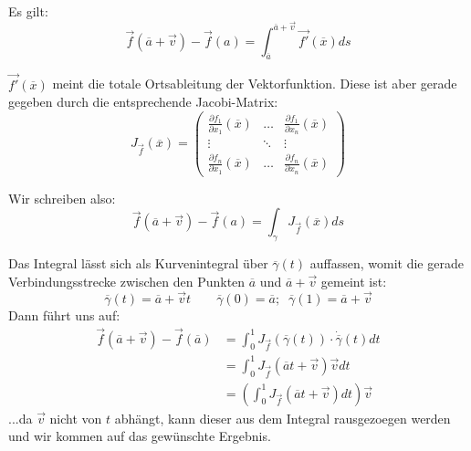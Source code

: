 \documentclass[a4paper,german,12pt,smallheadings]{scrartcl}
\begin{document}
Es gilt:
\begin{equation*}
\vec{f}\left(\overline{a}+\vec{v}\right)-\vec{f}(a)=\int_{\overline{a}}^{\overline{a}+\vec{v}}  \vec{f'}(\overline{x})ds
\end{equation*}

$\vec{f'}(\overline{x})$ meint die totale Ortsableitung der Vektorfunktion. Diese ist aber gerade gegeben durch die entsprechende Jacobi-Matrix:
\begin{equation*}
J_{\vec{f}}(\overline{x})=\begin{pmatrix}
\frac{\partial f_1}{\partial x_1}(\overline{x}) & \dots & \frac{\partial f_1}{\partial x_n}(\overline{x})\\ \vdots & \ddots & \vdots\\ \frac{\partial f_n}{\partial x_1}(\overline{x}) &
\dots & \frac{\partial f_n}{\partial x_n}(\overline{x})
\end{pmatrix}
\end{equation*}

Wir schreiben also:
\begin{equation*}
\vec{f}\left(\overline{a}+\vec{v}\right)-\vec{f}(a)=\int_\gamma J_{\vec{f}}(\overline{x})ds
\end{equation*}

Das Integral lässt sich als Kurvenintegral über $\overline{\gamma}(t)$ auffassen, womit die gerade Verbindungsstrecke zwischen den Punkten $\overline{a}$ und $\overline{a}+\vec{v}$ gemeint ist:
\begin{equation*}
\overline{\gamma}(t)=\overline{a}+\vec{v}t \quad \quad \overline{\gamma}(0)=\overline{a}; \;\; \overline{\gamma}(1)=\overline{a}+\vec{v}
\end{equation*}
Dann führt uns auf:
\begin{align*}
\vec{f}(\overline{a}+\vec{v})-\vec{f}(\overline{a})&=\int_{0}^{1}J_{\vec{f}}(\overline{\gamma}(t))\cdot \dot{\overline{\gamma}}(t)dt\\
&=\int_{0}^{1}J_{\vec{f}}(\overline{a}t+\vec{v})\vec{v}dt\\
&=\left(\int_{0}^{1}J_{\vec{f}}\left(\overline{a}t+\vec{v}\right)dt\right)\vec{v}
\end{align*}
...da $\vec{v}$ nicht von $t$ abhängt, kann dieser aus dem Integral rausgezoegen werden und wir kommen auf das gewünschte Ergebnis.
\end{document}
